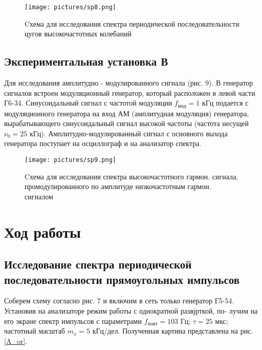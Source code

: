 \documentclass[a4paper, 14pt]{extarticle}%
\begin{document}
	
		
		\begin{figure}[h]
			\centering
			\texttt{[image: pictures/sp8.png]}
			\caption{Cхема для исследования спектра периодической последовательности цугов высокочастотных колебаний}
			\label{B}
		\end{figure}
		
\newpage
\newline
		
\subsection{Экспериментальная установка В}
		Для исследования амплитудно - модулированного сигнала (рис. 9). В генератор сигналов встроен модуляционный генератор, который расположен в левой части Г6-34. Синусоидальный сигнал с частотой модуляции $f_{мод}=1$ кГц подается с модуляционного генератора на вход АМ (амплитудная модуляция) генератора, вырабатывающего синусоидальный сигнал высокой частоты (частота несущей $\nu_{0}=25$ кГц). Амплитудно-модулированный сигнал с основного выхода генератора поступает на осциллограф и на анализатор спектра. 
		
		\begin{figure}[h]
			\centering
			\texttt{[image: pictures/sp9.png]}
			\caption{Cхема для исследования спектра высокочастотного гармон. сигнала, промодулированного по амплитуде низкочастотным гармон. сигналом}
			\label{C}
		\end{figure}
		
		
		\newpage
\newline

	\section{Ход работы}
  	
  	\subsection{Исследование спектра периодической последовательности прямоугольных импульсов}
  	
  	Соберем схему согласно рис. 7 и включим в сеть только генератор Г5-54.
 	Установив на анализаторе режим работы с однократной развјрткой, по-
  	лучим на его экране спектр импульсов с параметрами $ f_{повт}  = 103 $ Гц;
  $ \tau= 25 $ мкс; частотный масштаб $ m_x = 5 $ кГц/дел. Полученная картина представлена на рис. \ref{A_or}. 
  
\end{document}
